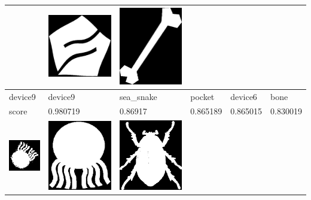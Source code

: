 \begin{table}[h!]
\begin{tabular}{ | m{2.2cm} | m{2.2cm} | m{2.2cm} | m{2.2cm} | m{2.2cm} | m{2.2cm} | }
\begin{minipage}{.3\textwidth}
    \end{minipage}
	&
    \begin{minipage}{.3\textwidth}
      \includegraphics[width=\linewidth, width=20mm]{images/device6-exp2}
    \end{minipage}
	&
    \begin{minipage}{.3\textwidth}
      \includegraphics[width=\linewidth, width=20mm]{images/bone}
    \end{minipage}
	\\ \hline
	device9 & device9 & sea\_snake & pocket & device6 & bone \\ \hline
	score & 0.980719 & 0.86917 & 0.865189 & 0.865015 & 0.830019 \\ \hline
	\begin{minipage}{.3\textwidth}
      \includegraphics[width=\linewidth, width=20mm]{images/test-octopus}
    \end{minipage}
    &
    \begin{minipage}{.3\textwidth}
      \includegraphics[width=\linewidth, width=20mm]{images/octopus}
    \end{minipage}
    & 
    \begin{minipage}{.3\textwidth}
      \includegraphics[width=\linewidth, width=20mm]{images/beetle}

\end{minipage}
\end{tabular}
\end{table}
